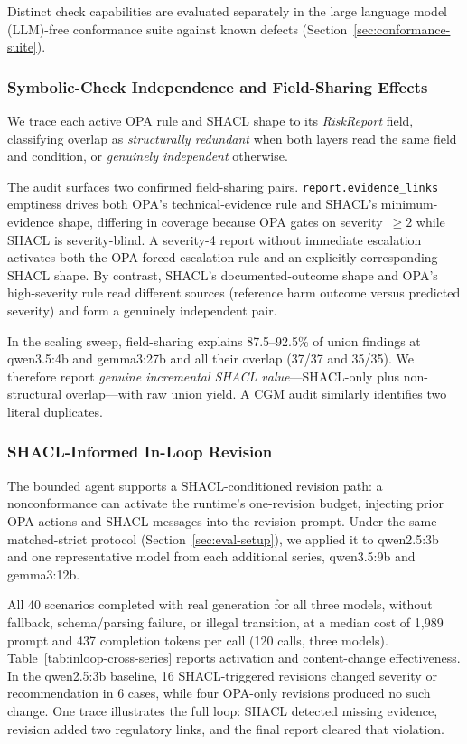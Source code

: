 \documentclass[journal,twoside,web]{ieeecolor}
\begin{document}
Distinct check capabilities are evaluated separately in the large language model (LLM)-free conformance suite against known defects (Section~\ref{sec:conformance-suite}).

\subsubsection{Symbolic-Check Independence and Field-Sharing Effects}
\label{sec:guard-independence}

We trace each active OPA rule and SHACL shape to its \textit{RiskReport} field, classifying overlap as \textit{structurally redundant} when both layers read the same field and condition, or \textit{genuinely independent} otherwise.

The audit surfaces two confirmed field-sharing pairs. \texttt{report.evidence\_links} emptiness drives both OPA's technical-evidence rule and SHACL's minimum-evidence shape, differing in coverage because OPA gates on severity~$\geq 2$ while SHACL is severity-blind. A severity-4 report without immediate escalation activates both the OPA forced-escalation rule and an explicitly corresponding SHACL shape. By contrast, SHACL's documented-outcome shape and OPA's high-severity rule read different sources (reference harm outcome versus predicted severity) and form a genuinely independent pair.

In the scaling sweep, field-sharing explains 87.5--92.5\% of union findings at qwen3.5:4b and gemma3:27b and all their overlap (37/37 and 35/35). We therefore report \textit{genuine incremental SHACL value}---SHACL-only plus non-structural overlap---with raw union yield. A CGM audit similarly identifies two literal duplicates.

\subsubsection{SHACL-Informed In-Loop Revision}
\label{sec:inloop-revision}

The bounded agent supports a SHACL-conditioned revision path: a nonconformance can activate the runtime's one-revision budget, injecting prior OPA actions and SHACL messages into the revision prompt. Under the same matched-strict protocol (Section~\ref{sec:eval-setup}), we applied it to qwen2.5:3b and one representative model from each additional series, qwen3.5:9b and gemma3:12b.

All 40 scenarios completed with real generation for all three models, without fallback, schema/parsing failure, or illegal transition, at a median cost of 1,989 prompt and 437 completion tokens per call (120 calls, three models). Table~\ref{tab:inloop-cross-series} reports activation and content-change effectiveness. In the qwen2.5:3b baseline, 16 SHACL-triggered revisions changed severity or recommendation in 6 cases, while four OPA-only revisions produced no such change. One trace illustrates the full loop: SHACL detected missing evidence, revision added two regulatory links, and the final report cleared that violation.
\end{document}
